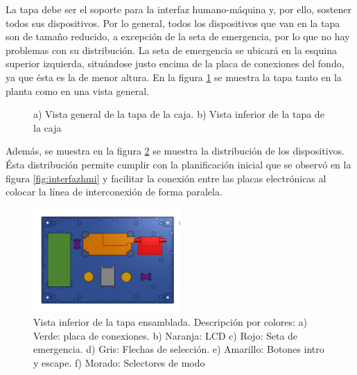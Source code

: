 La tapa debe ser el soporte para la interfaz humano-máquina y, por ello, sostener todos sus 
dispositivos. Por lo general, todos los dispositivos que van en la tapa son de tamaño reducido,
a excepción de la seta de emergencia, por lo que no hay problemas con su distribución. La seta
de emergencia se ubicará en la esquina superior izquierda, situándose justo encima de la placa
de conexiones del fondo, ya que ésta es la de menor altura. En la figura \ref{fig:cajatapa} se 
muestra la tapa tanto en la planta como en una vista general.

\begin{figure}[h]%
    \centering 
    \hspace{10pt}%
    \caption{a) Vista general de la tapa de la caja. b) Vista inferior de la tapa de la caja}
    \label{fig:cajatapa} 
\end{figure} 

Además, se muestra en la figura \ref{fig:cajatapaensamblaje} se muestra la distribución de los 
dispositivos. Ésta distribución permite cumplir con la planificación inicial que se observó en 
la figura \ref{fig:interfazhmi} y facilitar la conexión entre las placas electrónicas al colocar
la línea de interconexión de forma paralela.

\begin{figure}[h]%
    \centering 
        \includegraphics[width=0.5\textwidth]{04-caja/ensamblajetapainferior.png}
    \caption{Vista inferior de la tapa ensamblada. Descripción por colores: a) Verde: placa de 
    conexiones. b) Naranja: LCD c) Rojo: Seta de emergencia. d) Gris: Flechas de selección.
    e) Amarillo: Botones intro y escape. f) Morado: Selectores de modo}
    \label{fig:cajatapaensamblaje} 
\end{figure}